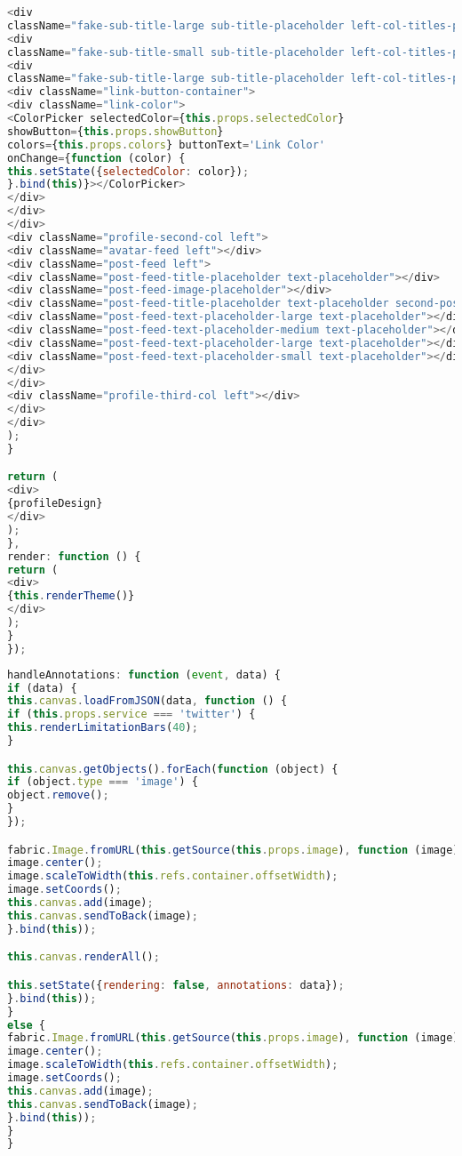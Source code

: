 \begin{lstlisting}[language=javascript]
<div
className="fake-sub-title-large sub-title-placeholder left-col-titles-placeholder second-paragraph"></div>
<div
className="fake-sub-title-small sub-title-placeholder left-col-titles-placeholder"></div>
<div
className="fake-sub-title-large sub-title-placeholder left-col-titles-placeholder"></div>
<div className="link-button-container">
<div className="link-color">
<ColorPicker selectedColor={this.props.selectedColor}
showButton={this.props.showButton}
colors={this.props.colors} buttonText='Link Color'
onChange={function (color) {
this.setState({selectedColor: color});
}.bind(this)}></ColorPicker>
</div>
</div>
</div>
<div className="profile-second-col left">
<div className="avatar-feed left"></div>
<div className="post-feed left">
<div className="post-feed-title-placeholder text-placeholder"></div>
<div className="post-feed-image-placeholder"></div>
<div className="post-feed-title-placeholder text-placeholder second-post"></div>
<div className="post-feed-text-placeholder-large text-placeholder"></div>
<div className="post-feed-text-placeholder-medium text-placeholder"></div>
<div className="post-feed-text-placeholder-large text-placeholder"></div>
<div className="post-feed-text-placeholder-small text-placeholder"></div>
</div>
</div>
<div className="profile-third-col left"></div>
</div>
</div>
);
}

return (
<div>
{profileDesign}
</div>
);
},
render: function () {
return (
<div>
{this.renderTheme()}
</div>
);
}
});
\end{lstlisting}




\begin{lstlisting}[language=javascript]
handleAnnotations: function (event, data) {
if (data) {
this.canvas.loadFromJSON(data, function () {
if (this.props.service === 'twitter') {
this.renderLimitationBars(40);
}

this.canvas.getObjects().forEach(function (object) {
if (object.type === 'image') {
object.remove();
}
});

fabric.Image.fromURL(this.getSource(this.props.image), function (image) {
image.center();
image.scaleToWidth(this.refs.container.offsetWidth);
image.setCoords();
this.canvas.add(image);
this.canvas.sendToBack(image);
}.bind(this));

this.canvas.renderAll();

this.setState({rendering: false, annotations: data});
}.bind(this));
}
else {
fabric.Image.fromURL(this.getSource(this.props.image), function (image) {
image.center();
image.scaleToWidth(this.refs.container.offsetWidth);
image.setCoords();
this.canvas.add(image);
this.canvas.sendToBack(image);
}.bind(this));
}
}
\end{lstlisting}

